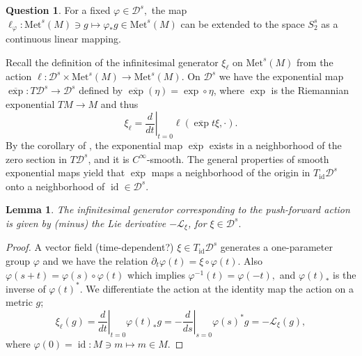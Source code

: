 \documentclass[a5paper,10pt,twoside]{article}
\newcommand{\cL}{\ensuremath{\mathcal{L}}}
\newcommand{\cD}{\ensuremath{\mathcal{D}}}
\newcommand{\Met}{\ensuremath{\mathrm{Met}}}
\DeclareMathOperator*{\Div}{div}
\DeclareMathOperator*{\id}{id}
\theoremstyle{plain}
\newtheorem{lem}[teo]{Lemma}
\theoremstyle{definition}
\newtheorem{question}{Question}
\theoremstyle{remark}
\begin{document}
\begin{question}
For a fixed $\varphi\in \cD^s,$ the map $\ell_\varphi:\Met^s(M)\ni g\mapsto\varphi_*g\in\Met^s(M)$ can be extended to the space $S_2^s$ as a continuous linear mapping.
\end{question}

Recall the definition of the infinitesimal generator $\xi_\ell$ on $\Met^s(M)$ from the action $\ell:\cD^s\times\Met^s(M)\to\Met^s(M)$. On $\cD^s$ we have the exponential map $\overline{\exp}:T\cD^s\to\cD^s$ defined by $\overline{\exp}(\eta)=\exp\circ\eta$, where $\exp$ is the Riemannian exponential $TM\to M$ and thus
%
\begin{equation}
\xi_\ell = \left.\frac{d}{dt}\right|_{t=0}\ell(\overline{\exp}t\xi,\cdot).
\end{equation}
%
By the corollary of \cite[Theorem 23.3]{glilikh1997}, the exponential map $\overline{\exp}$ exists in a neighborhood of the zero section in $T\cD^s$, and it is $C^\infty$-smooth. The general properties of smooth exponential maps yield that $\overline{\exp}$ maps a neighborhood of the origin in $T_{\id}\cD^s$ onto a neighborhood of $\id\in\cD^s.$

\begin{lem}\label{lem:Lie-derivative}
	The infinitesimal generator corresponding to the push-forward action is given by (minus) the Lie derivative $-\cL_\xi$, for $\xi\in\cD^s.$
\end{lem}

\begin{proof}
	A vector field (time-dependent?) $\xi\in T_{\id}\cD^s$ generates a one-parameter group $\varphi$ and we have the relation $\partial_{t}\varphi(t)=\xi\circ\varphi(t)$. Also $\varphi(s+t)=\varphi(s)\circ\varphi(t)$ which implies $\varphi^{-1}(t)=\varphi(-t),$ and $\varphi(t)_*$ is the inverse of $\varphi(t)^*.$
	We differentiate the action at the identity map the action on a metric $g$; 
	\[
	\xi_\ell(g)=\left.\frac{d}{dt}\right|_{t=0}\varphi(t)_{*}g=-\left.\frac{d}{ds}\right|_{s=0}\varphi(s)^{*}g=-\mathcal{L}_{\xi}(g),
	\]
	where $\varphi(0)=\id:M\ni m\mapsto m\in M$.
\end{proof}

%
\end{document}
